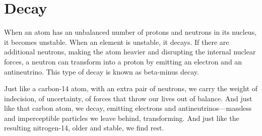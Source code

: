 
\chapter*{Decay}

When an atom has an unbalanced number of protons and neutrons in its nucleus, it becomes unstable. When an element is unstable, it decays. If there are additional neutrons, making the atom heavier and disrupting the internal nuclear forces, a neutron can transform into a proton by emitting an electron and an antineutrino. This type of decay is known as beta-minus decay.

Just like a carbon-14 atom, with an extra pair of neutrons, we carry the weight of indecision, of uncertainty, of forces that throw our lives out of balance. And just like that carbon atom, we decay, emitting electrons and antineutrinos—massless and imperceptible particles we leave behind, transforming. And just like the resulting nitrogen-14, older and stable, we find rest.
